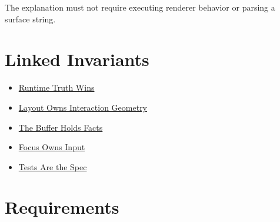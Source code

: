 The explanation must not require executing renderer behavior or parsing a surface string.

\section{Linked Invariants}\label{record-163-linked-invariants}

\begin{itemize}
\tightlist
\item
  \href{https://github.com/flyingrobots/bijou/blob/cbd70612140e7a450d764b3c7be1c6af878b99bc/docs/invariants/runtime-truth-wins.md}{Runtime Truth Wins}
\item
  \href{https://github.com/flyingrobots/bijou/blob/cbd70612140e7a450d764b3c7be1c6af878b99bc/docs/invariants/layout-owns-interaction-geometry.md}{Layout Owns Interaction Geometry}
\item
  \href{https://github.com/flyingrobots/bijou/blob/cbd70612140e7a450d764b3c7be1c6af878b99bc/docs/invariants/buffer-holds-facts.md}{The Buffer Holds Facts}
\item
  \href{https://github.com/flyingrobots/bijou/blob/cbd70612140e7a450d764b3c7be1c6af878b99bc/docs/invariants/focus-owns-input.md}{Focus Owns Input}
\item
  \href{https://github.com/flyingrobots/bijou/blob/cbd70612140e7a450d764b3c7be1c6af878b99bc/docs/invariants/tests-are-the-spec.md}{Tests Are the Spec}
\end{itemize}

\section{Requirements}\label{record-163-requirements}

